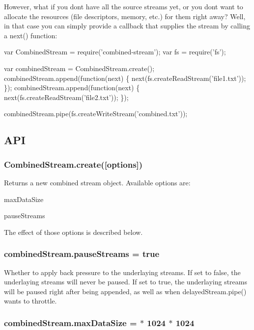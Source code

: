 However, what if you don\textquotesingle{}t have all the source streams yet, or you don\textquotesingle{}t want to allocate the resources (file descriptors, memory, etc.) for them right away? Well, in that case you can simply provide a callback that supplies the stream by calling a {\ttfamily next()} function\+:


\begin{DoxyCode}
var CombinedStream = require('combined-stream');
var fs = require('fs');

var combinedStream = CombinedStream.create();
combinedStream.append(function(next) \{
  next(fs.createReadStream('file1.txt'));
\});
combinedStream.append(function(next) \{
  next(fs.createReadStream('file2.txt'));
\});

combinedStream.pipe(fs.createWriteStream('combined.txt'));
\end{DoxyCode}


\subsection*{A\+PI}

\subsubsection*{Combined\+Stream.\+create(\mbox{[}options\mbox{]})}

Returns a new combined stream object. Available options are\+:


\begin{DoxyItemize}
\item {\ttfamily max\+Data\+Size}
\item {\ttfamily pause\+Streams}
\end{DoxyItemize}

The effect of those options is described below.

\subsubsection*{combined\+Stream.\+pause\+Streams = {\ttfamily true}}

Whether to apply back pressure to the underlaying streams. If set to {\ttfamily false}, the underlaying streams will never be paused. If set to {\ttfamily true}, the underlaying streams will be paused right after being appended, as well as when {\ttfamily delayed\+Stream.\+pipe()} wants to throttle.

\subsubsection*{combined\+Stream.\+max\+Data\+Size = { $\ast$ 1024 $\ast$ 1024}}

